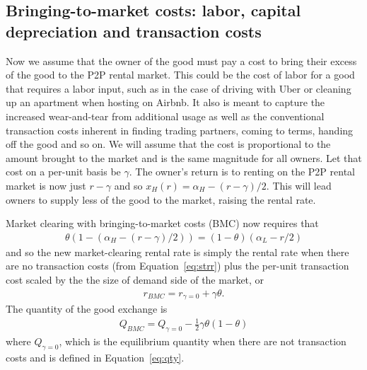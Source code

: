 \documentclass[11pt]{article}
\begin{document}

\subsection{Bringing-to-market costs: labor, capital depreciation and transaction costs}

Now we assume that the owner of the good must pay a cost to bring their excess of the good to the P2P rental market. 
This could be the cost of labor for a good that requires a labor input, such as in the case of driving with Uber or cleaning up an apartment when hosting on Airbnb.
It also is meant to capture the increased wear-and-tear from additional usage as well as the conventional transaction costs inherent in finding trading partners, coming to terms, handing off the good and so on.  
We will assume that the cost is proportional to the amount brought to the market and is the same magnitude for all owners.
Let that cost on a per-unit basis be $\gamma$. 
The owner's return is to renting on the P2P rental market is now just $r - \gamma$ and so $x_H(r) = \alpha_H - (r - \gamma)/2$.
This will lead owners to supply less of the good to the market, raising the rental rate.

Market clearing with bringing-to-market costs (BMC) now requires that 
\begin{align}
  \theta (1 - (\alpha_H - (r-\gamma)/2)) = (1-\theta)(\alpha_L - r/2)
\end{align}
and so the new market-clearing rental rate is simply the rental rate when there are no transaction costs (from Equation~\ref{eq:strr}) plus the per-unit transaction cost scaled by the the size of demand side of the market, or  
\begin{align}
  r_{BMC} = r_{\gamma = 0} + \gamma \theta. 
\end{align} 
The quantity of the good exchange is
\begin{align} \label{eq:qty_gamma}
  Q_{BMC} = Q_{\gamma = 0} - \frac{1}{2} \gamma \theta (1-\theta)
\end{align} 
where $Q_{\gamma = 0}$, which is the equilibrium quantity when there are not transaction costs and is defined in Equation~\ref{eq:qty}. 
\end{document}
